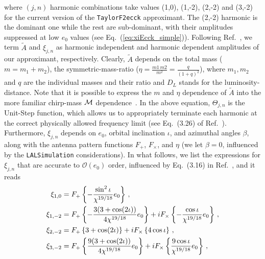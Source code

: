 \documentclass[aps,prd,twocolumn,superscriptaddress,groupedaddress,nofootinbib,showpacs,eqsecnum,useAms]{revtex4-2}
\begin{document}
where $(j, n)$ harmonic combinations take values (1,0), (1,-2), (2,-2) and (3,-2) for the current version of the \texttt{TaylorF2ecck} approximant. The (2,-2) harmonic is the dominant one while the rest are sub-dominant, with their amplitudes suppressed at low $e_0$ values (see Eq.~(\ref{eq:xiEcck_simple})). Following Ref.~\cite{TGHH}, we  term $\tilde{A}$ and $\xi_{j,n}$ as harmonic independent and harmonic dependent amplitudes of our approximant, respectively. Clearly, $\tilde{A}$ depends on the total mass ($m=m_1+m_2$), the symmetric-mass-ratio ($\eta=\frac{m1\,m2}{m^2} = \frac{q}{(1+q)^2}$), where 
$m_1, m_2$ and $q$ are the individual masses and their ratio and $D_L$ stands for the luminosity-distance. Note that it is possible to express the $m$ and $\eta$ dependence of 
$\tilde{A}$
into the more familiar chirp-mass ${\cal M}$ dependence~\cite{findchirp}. In the above equation,
$\Theta_{j,n}$ is the Unit-Step function, which allows us to appropriately terminate each harmonic at the correct physically allowed frequency limit (see Eq.~(3.26) of Ref.~\cite{TGHH}).
Furthermore, $\xi_{j,n}$ depends on $e_0$, orbital inclination $\iota$, and azimuthal angles $\beta$, along with the antenna pattern functions $F_+$, $F_{\times}$, and $\eta$ (we let $\beta=0$, influenced by the \texttt{LALSimulation} considerations). In what follows, we list the expressions for $\xi_{j,n}$ that are accurate to $\mathcal{O}(e_0)$ order, influenced by Eq.~(3.16) in Ref.~\cite{TGHH}, and it reads 
\begin{align}
\xi_{1,0} &= F_+\left\{-\frac{\sin^2 \iota}{\chi^{19/18}} e_0\right\}\,, \notag \\ 
\xi_{1,-2} &= F_+\left\{-\frac{3(3+\cos(2\iota))}{4\chi^{19/18}} e_0 \right\} + i F_\times \left\{-\frac{\cos\iota}{\chi^{19/18}} e_0 \right\}\,, \notag \\ 
\xi_{2,-2} &= F_+\left\{3 + \cos(2\iota)\right\} + i F_\times \left\{4 \cos\iota\right\}\,, \notag \\ 
\xi_{3,-2} &= F_+\left\{\frac{9(3+\cos(2\iota))}{4\chi^{19/18}} e_0 \right\} + i F_\times \left\{\frac{9 \cos\iota}{\chi^{19/18}} e_0 \right\}\,, \label{eq:xiEcck_simple}
\end{align}
\end{document}
